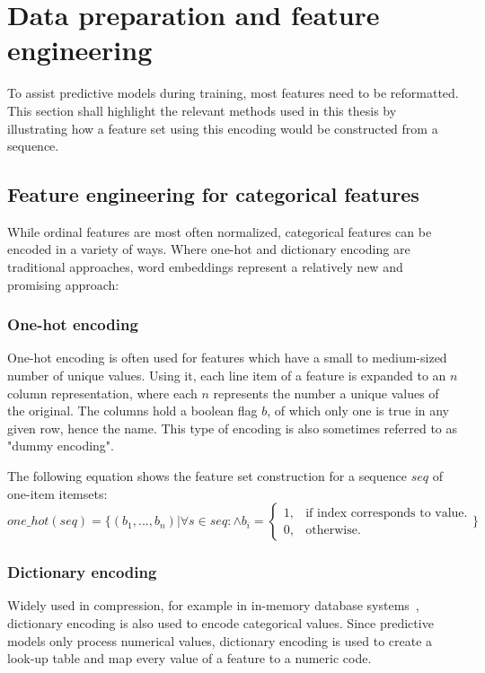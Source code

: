 \section{Data preparation and feature engineering}
To assist predictive models during training, most features need to be reformatted. This section shall highlight the relevant methods used in this thesis by illustrating how a feature set using this encoding would be constructed from a sequence.

\subsection{Feature engineering for categorical features}
While ordinal features are most often normalized, categorical features can be encoded in a variety of ways. Where one-hot and dictionary encoding are traditional approaches, word embeddings represent a relatively new and promising approach:

\subsubsection*{One-hot encoding}
One-hot encoding is often used for features which have a small to medium-sized number of unique values. Using it, each line item of a feature is expanded to an $n$ column representation, where each $n$ represents the number a unique values of the original. The columns hold a boolean flag $b$, of which only one is true in any given row, hence the name. This type of encoding is also sometimes referred to as "dummy encoding".

The following equation shows the feature set construction for a sequence $seq$ of one-item itemsets:
\begin{equation}\label{eq:one-hot}
    one\_hot(seq) = \{(b_1, ..., b_n) | \forall s \in seq: \wedge b_i = 
    \begin{cases}
    1, & \text{if index corresponds to value}.\\
    0, & \text{otherwise}.
    \end{cases}
    \}
\end{equation}

\subsubsection*{Dictionary encoding}
Widely used in compression, for example in in-memory database systems~\cite{plattner2012memory}, dictionary encoding is also used to encode categorical values. Since predictive models only process numerical values, dictionary encoding is used to create a look-up table and map every value of a feature to a numeric code.

